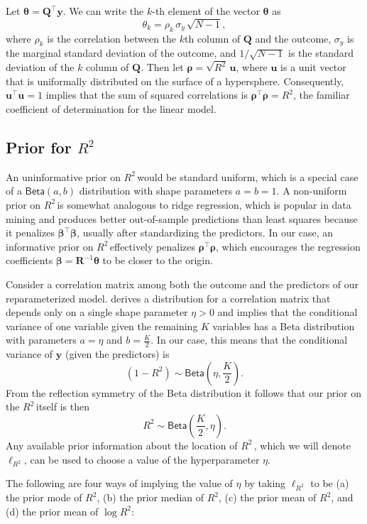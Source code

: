 \documentclass[11pt]{article}
\newcommand{\Rsq}{$R^2\,$}
\newcommand{\boldrho}{\boldsymbol{\rho}}
\newcommand{\boldbeta}{\boldsymbol{\beta}}
\newcommand{\boldtheta}{\boldsymbol{\theta}}
\newcommand{\y}{\mathbf{y}}
\newcommand{\Q}{\mathbf{Q}}
\newcommand{\R}{\mathbf{R}}
\renewcommand{\u}{\mathbf{u}}
\newcommand{\locRsq}{\ell_{R^2}}
\newcommand{\halfK}{\frac{K}{2}}
\newcommand{\Betadist}[2]{\mathsf{Beta}\left(#1,#2\right)}
\begin{document}
Let $\boldtheta = \Q^\top \y$. We can write the $k$-th element of the vector
$\boldtheta$ as
$$\theta_k = \rho_k \, \sigma_y \, \sqrt{N - 1},$$
where $\rho_k$ is the correlation between the $k$th column of $\Q$ and the
outcome, $\sigma_y$ is the marginal standard deviation of the outcome, and
$1/\sqrt{N-1}$ is the standard deviation of the $k$ column of $\Q$. Then let
$\boldrho = \sqrt{R^2} \, \u$, where $\u$ is a unit vector that is
uniformally distributed on the surface of a hypersphere. Consequently,
$\u^\top \u = 1$ implies that the sum of squared correlations is
$\boldrho^\top \boldrho = R^2$, the familiar coefficient of determination for
the linear model.

\subsection{Prior for \Rsq}
\label{subsec:r2prior}

An uninformative prior on \Rsq would be standard uniform, which is a special
case of a $\Betadist{a}{b}$ distribution with shape parameters $a = b = 1$.
A non-uniform prior on \Rsq is somewhat analogous to ridge
regression, which is popular in data mining and produces better out-of-sample
predictions than least squares because it penalizes $\boldbeta^\top \boldbeta$,
usually after standardizing the predictors. In our case, an informative prior on
\Rsq effectively penalizes $\boldrho^\top \boldrho$, which encourages the
regression coefficients $\boldbeta = \R^{-1} \boldtheta$ to be closer to the
origin.

Consider a correlation matrix among both the outcome and the predictors of our
reparameterized model.  derives a distribution for a correlation
matrix that depends only on a single shape parameter $\eta > 0$ and implies that
the conditional variance of one variable given the remaining $K$ variables has a
Beta distribution with parameters $a = \eta$ and $b = \halfK$. In our case, this
means that the conditional variance of $\y$ (given the predictors) is
$$(1 - R^2) \sim \Betadist{\eta}{\halfK}.$$
From the reflection symmetry of the Beta distribution it follows that our prior
on the \Rsq itself is then
$$R^2 \sim \Betadist{\halfK}{\eta}.$$
Any available prior information about the location of \Rsq, which we will denote
$\locRsq$, can be used to choose a value of the hyperparameter $\eta$.

The following are four ways of implying the value of $\eta$ by taking
$\locRsq$ to be (a) the prior mode of $R^2$, (b) the prior median of $R^2$,
(c) the prior mean of $R^2$, and (d) the prior mean of $\log{R^2}$:
\end{document}
